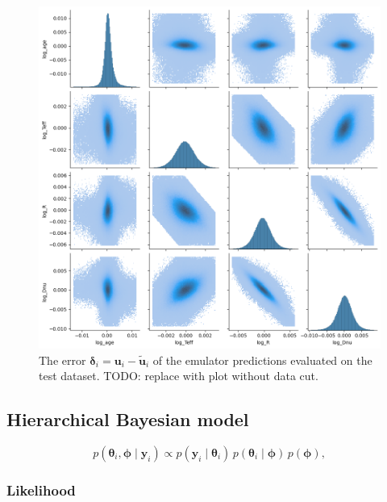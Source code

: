 \documentclass[fleqn,usenatbib]{mnras}
\renewcommand*{\vec}[1]{\boldsymbol{#1}}
\newcommand{\obs}{{y}}
\newcommand{\outputs}{{u}}
\newcommand{\pred}{{\tilde{\outputs}}}
\newcommand{\error}{{\delta}}
\begin{document}
\begin{figure}
    \centering
    \includegraphics[width=1.0\linewidth]{figures/error.png}
    \caption{The error \(\vec\error_i = \vec\outputs_i - \vec\pred_i\) of the emulator predictions evaluated on the test dataset. TODO: replace with plot without data cut.}
    \label{fig:error}
\end{figure}

\subsection{Hierarchical Bayesian model}
\label{sec:hbm}

%
\begin{equation}
    p(\vec \theta_i, \vec \phi \mid \vec\obs_i) \propto p(\vec\obs_i \mid \vec \theta_i) \, p(\vec\theta_i \mid \vec\phi) \, p(\vec\phi),
\end{equation}
%

\subsubsection{Likelihood}
\end{document}
